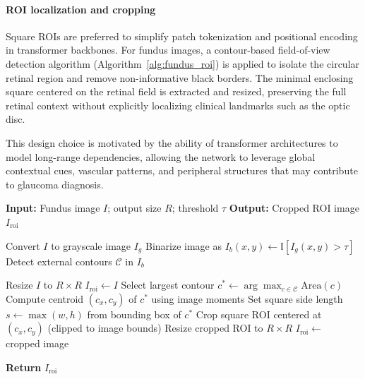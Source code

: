 \documentclass[preprint,12pt]{elsarticle}
\begin{document}
\paragraph{ROI localization and cropping}
Square ROIs are preferred to simplify patch tokenization and positional encoding in transformer backbones. For fundus images, a contour-based field-of-view detection algorithm (Algorithm~\ref{alg:fundus_roi}) is applied to isolate the circular retinal region and remove non-informative black borders. The minimal enclosing square centered on the retinal field is extracted and resized, preserving the full retinal context without explicitly localizing clinical landmarks such as the optic disc.

This design choice is motivated by the ability of transformer architectures to model long-range dependencies, allowing the network to leverage global contextual cues, vascular patterns, and peripheral structures that may contribute to glaucoma diagnosis.

\begin{algorithm}[!t]
    \caption{Field-of-View Centered ROI Extraction (Fundus)}
    \label{alg:fundus_roi}
    \begin{algorithmic}[1]

        \STATE \textbf{Input:} Fundus image $I$; output size $R$; threshold $\tau$
        \STATE \textbf{Output:} Cropped ROI image $I_{\text{roi}}$

        \STATE Convert $I$ to grayscale image $I_g$
        \STATE Binarize image as $I_b(x,y) \leftarrow \mathbb{I}[I_g(x,y) > \tau]$
        \STATE Detect external contours $\mathcal{C}$ in $I_b$

        \STATE Resize $I$ to $R \times R$
        \STATE $I_{\text{roi}} \leftarrow I$
        \ELSE
        \STATE Select largest contour $c^* \leftarrow \arg\max_{c \in \mathcal{C}} \text{Area}(c)$
        \STATE Compute centroid $(c_x, c_y)$ of $c^*$ using image moments
        \STATE Set square side length $s \leftarrow \max(w, h)$ from bounding box of $c^*$
        \STATE Crop square ROI centered at $(c_x, c_y)$ (clipped to image bounds)
        \STATE Resize cropped ROI to $R \times R$
        \STATE $I_{\text{roi}} \leftarrow$ cropped image
        \ENDIF

        \STATE \textbf{Return} $I_{\text{roi}}$

    \end{algorithmic}
\end{algorithm}
\end{document}
